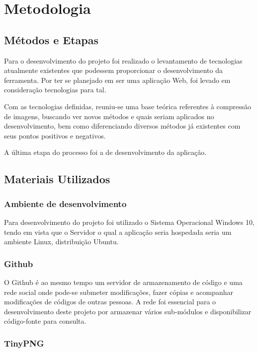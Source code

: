\chapter{Metodologia}
\label{c.metodologia}

\section{Métodos e Etapas}
\label{s.metodoseetapas}

Para o desenvolvimento do projeto foi realizado o levantamento de tecnologias atualmente existentes que podessem proporcionar o desenvolvimento da ferramenta. Por ter se planejado em ser uma aplicação Web, foi levado em consideração tecnologias para tal.

Com as tecnologias definidas, reuniu-se uma base teórica referentes à compressão de imagens, buscando ver novos métodos e quais seriam aplicados no desenvolvimento, bem como diferenciando diversos métodos já existentes com seus pontos positivos e negativos.

A última etapa do processo foi a de desenvolvimento da aplicação.

\section{Materiais Utilizados}
\label{s.materiaisutilizados}

\subsection{Ambiente de desenvolvimento}
\label{s.windows}

Para desenvolvimento do projeto foi utilizado o Sistema Operacional Windows 10, tendo em vista que o Servidor o qual a aplicação seria hospedada seria um ambiente Linux, distribuição Ubuntu.

\subsection{Github}
\label{s.github}

O Github é ao mesmo tempo um servidor de armazenamento de código e uma rede social onde pode-se submeter modificações, fazer cópias e acompanhar modificações de códigos de outras pessoas. A rede foi essencial para o desenvolvimento deste projeto por armazenar vários sub-módulos e disponibilizar código-fonte para consulta.

\subsection{TinyPNG}
\label{s.github}

